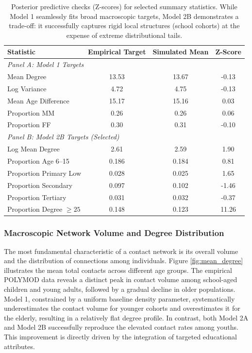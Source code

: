 \begin{table}[H]
    \centering
    \caption{Posterior predictive checks (Z-scores) for selected summary statistics. While Model 1 seamlessly fits broad macroscopic targets, Model 2B demonstrates a trade-off: it successfully captures rigid local structures (school cohorts) at the expense of extreme distributional tails.}
    \label{tab:zscore_recovery}
    \begin{tabular}{lccc}
        \toprule
        \textbf{Statistic} & \textbf{Empirical Target} & \textbf{Simulated Mean} & \textbf{Z-Score} \\
        \midrule
        \multicolumn{4}{l}{\textit{Panel A: Model 1 Targets}} \\
        Mean Degree & 13.53 & 13.67 & -0.13 \\
        Log Variance & 4.72 & 4.75 & -0.13 \\
        Mean Age Difference & 15.17 & 15.16 & 0.03 \\
        Proportion MM & 0.26 & 0.26 & 0.06 \\
        Proportion FF & 0.30 & 0.31 & -0.10 \\
        \midrule
        \multicolumn{4}{l}{\textit{Panel B: Model 2B Targets (Selected)}} \\
        Log Mean Degree & 2.61 & 2.59 & 1.90 \\
        Proportion Age 6--15 & 0.186 & 0.184 & 0.81 \\
        Proportion Primary Low & 0.028 & 0.025 & 1.65 \\
        Proportion Secondary & 0.097 & 0.102 & -1.46 \\
        Proportion Tertiary & 0.031 & 0.032 & -0.37 \\
        Proportion Degree $\ge 25$ & 0.148 & 0.123 & 11.26 \\
        \bottomrule
    \end{tabular}
\end{table}

\subsubsection{Macroscopic Network Volume and Degree Distribution}

The most fundamental characteristic of a contact network is its overall volume and the distribution of connections among individuals.
Figure \ref{fig:mean_degree} illustrates the mean total contacts across different age groups.
The empirical POLYMOD data reveals a distinct peak in contact volume among school-aged children and young adults, followed by a gradual decline in older populations.
Model 1, constrained by a uniform baseline density parameter, systematically underestimates the contact volume for younger cohorts and overestimates it for the elderly, resulting in a relatively flat degree profile.
In contrast, both Model 2A and Model 2B successfully reproduce the elevated contact rates among youths.
This improvement is directly driven by the integration of targeted educational attributes.

